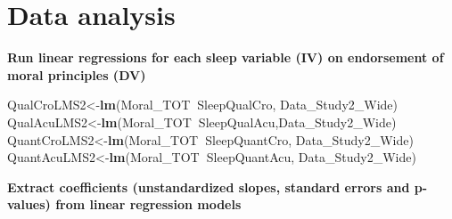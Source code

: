 \documentclass[
]{book}
\newenvironment{Shaded}{\begin{snugshade}}{\end{snugshade}}
\newcommand{\KeywordTok}[1]{\textcolor[rgb]{0.13,0.29,0.53}{\textbf{#1}}}
\newcommand{\NormalTok}[1]{#1}
\newcommand{\OperatorTok}[1]{\textcolor[rgb]{0.81,0.36,0.00}{\textbf{#1}}}
\begin{document}
\hypertarget{data-analysis-1}{%
\section{Data analysis}\label{data-analysis-1}}

\textbf{Run linear regressions for each sleep variable (IV) on endorsement of moral principles (DV)}

\begin{Shaded}
\begin{Highlighting}[]
\NormalTok{QualCroLMS2<-}\KeywordTok{lm}\NormalTok{(Moral_TOT}\OperatorTok{~}\NormalTok{SleepQualCro, Data_Study2_Wide)}
\NormalTok{QualAcuLMS2<-}\KeywordTok{lm}\NormalTok{(Moral_TOT}\OperatorTok{~}\NormalTok{SleepQualAcu,Data_Study2_Wide)}
\NormalTok{QuantCroLMS2<-}\KeywordTok{lm}\NormalTok{(Moral_TOT}\OperatorTok{~}\NormalTok{SleepQuantCro, Data_Study2_Wide)}
\NormalTok{QuantAcuLMS2<-}\KeywordTok{lm}\NormalTok{(Moral_TOT}\OperatorTok{~}\NormalTok{SleepQuantAcu, Data_Study2_Wide)}
\end{Highlighting}
\end{Shaded}

\textbf{Extract coefficients (unstandardized slopes, standard errors and p-values) from linear regression models }
\end{document}
